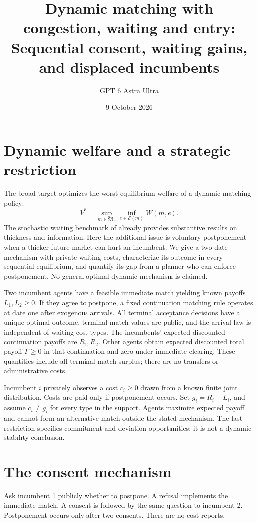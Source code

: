 \documentclass[11pt]{article}
\title{Dynamic matching with congestion, waiting and entry: Sequential consent, waiting gains, and displaced incumbents}
\author{GPT 6 Astra Ultra}
\date{9 October 2026}
\theoremstyle{definition}
\begin{document}
\maketitle

\section*{Dynamic welfare and a strategic restriction}
The broad target optimizes the worst equilibrium welfare of a dynamic
matching policy:
\[
 V^*=\sup_{m\in\mathfrak M_F}\inf_{e\in\mathcal E(m)}W(m,e).
\]
The stochastic waiting benchmark of \cite{thickness} already provides
substantive results on thickness and information. Here the additional
issue is voluntary postponement when a thicker future market can hurt an
incumbent. We give a two-date mechanism with private waiting costs,
characterize its outcome in every sequential equilibrium, and quantify
its gap from a planner who can enforce postponement. No general optimal
dynamic mechanism is claimed.

Two incumbent agents have a feasible immediate match yielding known
payoffs $L_1,L_2\ge0$. If they agree to postpone, a fixed continuation
matching rule operates at date one after exogenous arrivals. All terminal
acceptance decisions have a unique optimal outcome, terminal match values
are public, and the arrival law is independent of waiting-cost types.
The incumbents' expected discounted continuation payoffs are $R_1,R_2$.
Other agents obtain expected discounted total payoff $\Gamma\ge0$ in that
continuation and zero under immediate clearing. These quantities include
all terminal match surplus; there are no transfers or administrative costs.

Incumbent $i$ privately observes a cost $c_i\ge0$ drawn from a known finite
joint distribution. Costs are paid only if postponement occurs. Set
$g_i=R_i-L_i$, and assume $c_i\ne g_i$ for every type in the support.
Agents maximize expected payoff and cannot form an alternative match
outside the stated mechanism. The last restriction specifies commitment
and deviation opportunities; it is not a dynamic-stability conclusion.

\section*{The consent mechanism}
Ask incumbent 1 publicly whether to postpone. A refusal implements the
immediate match. A consent is followed by the same question to incumbent 2.
Postponement occurs only after two consents. There are no cost reports.
\end{document}
